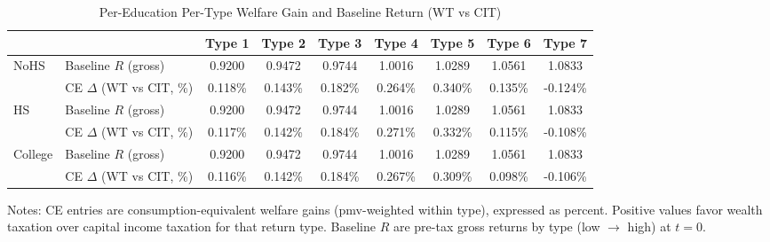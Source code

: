 \begin{table}[!htbp]
\centering
\caption{Per-Education Per-Type Welfare Gain and Baseline Return (WT vs CIT)}
\label{tab:ce_per_type_wt_vs_cit_lc}
\begin{threeparttable}
\begin{tabular}{llccccccc}
\toprule
\multicolumn{2}{c}{} & \textbf{Type 1} & \textbf{Type 2} & \textbf{Type 3} & \textbf{Type 4} & \textbf{Type 5} & \textbf{Type 6} & \textbf{Type 7} \\
\midrule
\multirow{2}{*}{NoHS}
  & Baseline $R$ (gross)   & 0.9200 & 0.9472 & 0.9744 & 1.0016 & 1.0289 & 1.0561 & 1.0833 \\
  & CE $\Delta$ (WT vs CIT, \%) & 0.118\% & 0.143\% & 0.182\% & 0.264\% & 0.340\% & 0.135\% & -0.124\% \\
\midrule
\multirow{2}{*}{HS}
  & Baseline $R$ (gross)   & 0.9200 & 0.9472 & 0.9744 & 1.0016 & 1.0289 & 1.0561 & 1.0833 \\
  & CE $\Delta$ (WT vs CIT, \%) & 0.117\% & 0.142\% & 0.184\% & 0.271\% & 0.332\% & 0.115\% & -0.108\% \\
\midrule
\multirow{2}{*}{College}
  & Baseline $R$ (gross)   & 0.9200 & 0.9472 & 0.9744 & 1.0016 & 1.0289 & 1.0561 & 1.0833 \\
  & CE $\Delta$ (WT vs CIT, \%) & 0.116\% & 0.142\% & 0.184\% & 0.267\% & 0.309\% & 0.098\% & -0.106\% \\
\bottomrule
\end{tabular}
\begin{tablenotes}[flushleft]
\footnotesize
\item Notes: CE entries are consumption-equivalent welfare gains (pmv-weighted within type), expressed as percent. Positive values favor wealth taxation over capital income taxation for that return type. Baseline $R$ are pre-tax gross returns by type (low $\rightarrow$ high) at $t=0$.
\end{tablenotes}
\end{threeparttable}
\end{table}

